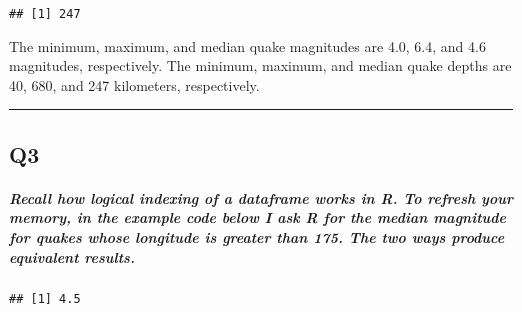 \documentclass[
]{article}
\newenvironment{Shaded}{\begin{snugshade}}{\end{snugshade}}
\newcommand{\CommentTok}[1]{\textcolor[rgb]{0.56,0.35,0.01}{\textit{#1}}}
\newcommand{\DecValTok}[1]{\textcolor[rgb]{0.00,0.00,0.81}{#1}}
\newcommand{\FunctionTok}[1]{\textcolor[rgb]{0.00,0.00,0.00}{#1}}
\newcommand{\NormalTok}[1]{#1}
\newcommand{\SpecialCharTok}[1]{\textcolor[rgb]{0.00,0.00,0.00}{#1}}
\begin{document}
\begin{Shaded}
\end{Shaded}

\begin{verbatim}
## [1] 247
\end{verbatim}

The minimum, maximum, and median quake magnitudes are 4.0, 6.4, and 4.6
magnitudes, respectively. The minimum, maximum, and median quake depths
are 40, 680, and 247 kilometers, respectively.

\begin{center}\rule{0.5\linewidth}{0.5pt}\end{center}

\hypertarget{q3}{%
\subsection{Q3}\label{q3}}

\hypertarget{recall-how-logical-indexing-of-a-dataframe-works-in-r.-to-refresh-your-memory-in-the-example-code-below-i-ask-r-for-the-median-magnitude-for-quakes-whose-longitude-is-greater-than-175.-the-two-ways-produce-equivalent-results.}{%
\subparagraph{Recall how logical indexing of a dataframe works in R. To
refresh your memory, in the example code below I ask R for the median
magnitude for quakes whose longitude is greater than 175. The two ways
produce equivalent
results.}\label{recall-how-logical-indexing-of-a-dataframe-works-in-r.-to-refresh-your-memory-in-the-example-code-below-i-ask-r-for-the-median-magnitude-for-quakes-whose-longitude-is-greater-than-175.-the-two-ways-produce-equivalent-results.}}

\begin{Shaded}
\end{Shaded}

\begin{verbatim}
## [1] 4.5
\end{verbatim}

\begin{Shaded}
\end{Shaded}
\end{document}
